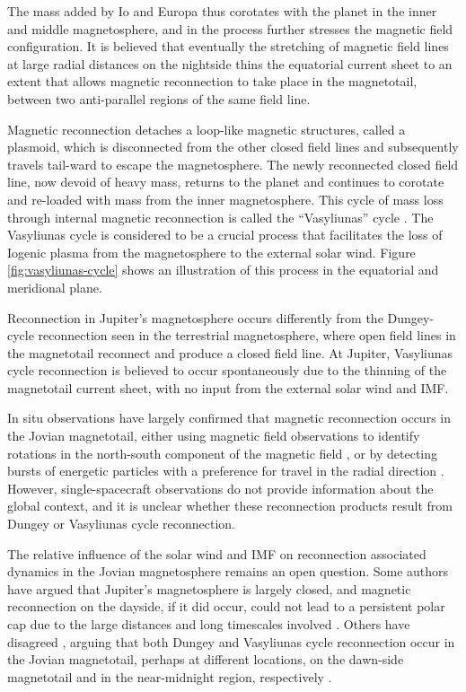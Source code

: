 The mass added by Io and Europa thus corotates with the planet in the inner and middle magnetosphere, and in the process further stresses the magnetic field configuration. It is believed that eventually the stretching of magnetic field lines at large radial distances on the nightside thins the equatorial current sheet to an extent that allows magnetic reconnection to take place in the magnetotail, between two anti-parallel regions of the same field line. 

Magnetic reconnection detaches a loop-like magnetic structures, called a plasmoid, which is disconnected from the other closed field lines and subsequently travels tail-ward to escape the magnetosphere. The newly reconnected closed field line, now devoid of heavy mass, returns to the planet and continues to corotate and re-loaded with mass from the inner magnetosphere. This cycle of mass loss through internal magnetic reconnection is called the ``Vasyliunas'' cycle \cite{Vasyliunas1983a}. The Vasyliunas cycle is considered to be a crucial process that facilitates the loss of Iogenic plasma from the magnetosphere to the external solar wind. Figure \ref{fig:vasyliunas-cycle} shows an illustration of this process in the equatorial and meridional plane. 

Reconnection in Jupiter's magnetosphere occurs differently from the Dungey-cycle reconnection seen in the terrestrial magnetosphere, where open field lines in the magnetotail reconnect and produce a closed field line. At Jupiter, Vasyliunas cycle reconnection is believed to occur spontaneously due to the thinning of the magnetotail current sheet, with no input from the external solar wind and IMF.  

In situ observations have largely confirmed that magnetic reconnection occurs in the Jovian magnetotail, either using magnetic field observations to identify rotations in the north-south component of the magnetic field \cite{Vogt2010a,Vogt2014}, or by detecting bursts of energetic particles with a preference for travel in the radial direction \cite{Woch2002a,Kronberg2008MassParameters, Kronberg2007AMagnetosphere}. However, single-spacecraft observations do not provide information about the global context, and it is unclear whether these reconnection products result from Dungey or Vasyliunas cycle reconnection. 

The relative influence of the solar wind and IMF on reconnection associated dynamics in the Jovian magnetosphere remains an open question. Some authors have argued that Jupiter's magnetosphere is largely closed, and magnetic reconnection on the dayside, if it did occur, could not lead to a persistent polar cap due to the large distances and long timescales involved \cite{McComas2007}. Others have disagreed \cite{Cowley2008}, arguing that both Dungey and Vasyliunas cycle reconnection occur in the Jovian magnetotail, perhaps at different locations, on the dawn-side magnetotail and in the near-midnight region, respectively \cite{Cowley2003a}. 



